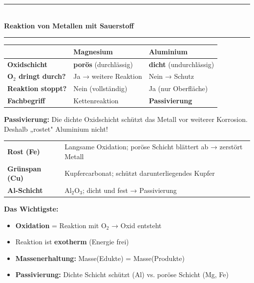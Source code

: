 \documentclass[9pt, a4paper]{article}
\newcommand{\seitentitel}[1]{%
    \noindent\textcolor{fachfarbe}{\rule{\textwidth}{1.5pt}}\\[-0.1em]
    {\Large\bfseries\textcolor{fachfarbe}{#1}}\\[-0.3em]
    \textcolor{fachfarbe}{\rule{\textwidth}{0.4pt}}
    \vspace{0.3em}
}
\newcommand{\abschnitt}[1]{%
    \vspace{6pt}%
    \noindent{\normalsize\bfseries\textcolor{fachfarbe}{#1}}%
    \vspace{2pt}%
    \nopagebreak[4]%
}
\begin{document}
\newpage

\seitentitel{Reaktion von Metallen mit Sauerstoff}

\abschnitt{Oxidschichten: Porös oder dicht?}

\begin{center}
\small
\begin{tabular}{|p{3.5cm}|p{5cm}|p{5cm}|}
\hline
& \textbf{Magnesium} & \textbf{Aluminium} \\
\hline
\textbf{Oxidschicht} & \textbf{porös} (durchlässig) & \textbf{dicht} (undurchlässig) \\
\hline
\textbf{O$_2$ dringt durch?} & Ja → weitere Reaktion & Nein → Schutz \\
\hline
\textbf{Reaktion stoppt?} & Nein (vollständig) & Ja (nur Oberfläche) \\
\hline
\textbf{Fachbegriff} & Kettenreaktion & \textbf{Passivierung} \\
\hline
\end{tabular}
\end{center}

\begin{merkkasten}
\textbf{Passivierung:} Die dichte Oxidschicht schützt das Metall vor weiterer Korrosion. Deshalb „rostet" Aluminium nicht!
\end{merkkasten}

\abschnitt{Korrosion im Alltag}

\begin{tabular}{@{}p{2.5cm}p{12cm}@{}}
\textbf{Rost (Fe)} & Langsame Oxidation; poröse Schicht blättert ab → zerstört Metall \\
\textbf{Grünspan (Cu)} & Kupfercarbonat; schützt darunterliegendes Kupfer \\
\textbf{Al-Schicht} & Al$_2$O$_3$; dicht und fest → Passivierung
\end{tabular}

\vspace{8pt}

\begin{merkkasten}
\textbf{Das Wichtigste:}
\begin{itemize}[leftmargin=1.2em, itemsep=0pt, topsep=2pt]
    \item \textbf{Oxidation} = Reaktion mit O$_2$ → Oxid entsteht
    \item Reaktion ist \textbf{exotherm} (Energie frei)
    \item \textbf{Massenerhaltung:} Masse(Edukte) = Masse(Produkte)
    \item \textbf{Passivierung:} Dichte Schicht schützt (Al) vs. poröse Schicht (Mg, Fe)
\end{itemize}
\end{merkkasten}
\end{document}
